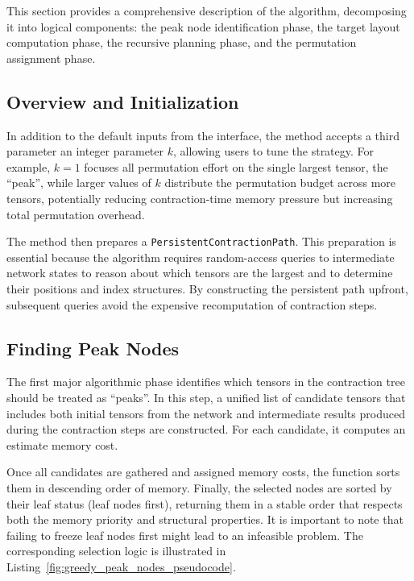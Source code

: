 This section provides a comprehensive description of the algorithm, decomposing it into logical components: the peak node identification phase, the target layout computation phase, the recursive planning phase, and the permutation assignment phase.

\subsection{Overview and Initialization}

In addition to the default inputs from the interface, the method accepts a third parameter an integer parameter $k$, allowing users to tune the strategy. For example, $k = 1$ focuses all permutation effort on the single largest tensor, the ``peak'', while larger values of $k$ distribute the permutation budget across more tensors, potentially reducing contraction-time memory pressure but increasing total permutation overhead.

The method then prepares a \texttt{PersistentContractionPath}. This preparation is essential because the algorithm requires random-access queries to intermediate network states to reason about which tensors are the largest and to determine their positions and index structures. By constructing the persistent path upfront, subsequent queries avoid the expensive recomputation of contraction steps.

\subsection{Finding Peak Nodes}

The first major algorithmic phase identifies which tensors in the contraction tree should be treated as ``peaks''. In this step, a unified list of candidate tensors that includes both initial tensors from the network and intermediate results produced during the contraction steps are constructed. For each candidate, it computes an estimate memory cost.

Once all candidates are gathered and assigned memory costs, the function sorts them in descending order of memory. Finally, the selected nodes are sorted by their leaf status (leaf nodes first), returning them in a stable order that respects both the memory priority and structural properties. It is important to note that failing to freeze leaf nodes first might lead to an infeasible problem. The corresponding selection logic is illustrated in Listing~\ref{fig:greedy_peak_nodes_pseudocode}.

